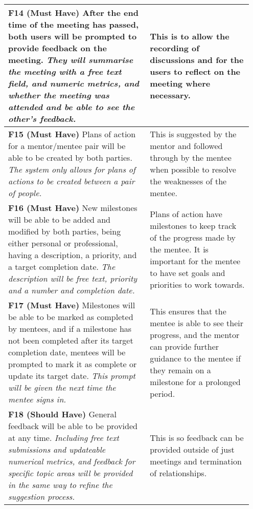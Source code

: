 \documentclass[10pt]{article}
\begin{document}
\begin{longtable}{|p{0.55\linewidth}|p{0.4\linewidth}|}
    \textbf{F14 (Must Have) }
    After the end time of the meeting has passed, both users will be prompted to
    provide feedback on the meeting.
    \textit{They will summarise the meeting with a free text field, and numeric
    metrics, and whether the meeting was attended and be able to see the other's
    feedback.}
        &
    This is to allow the recording of discussions and for the users to reflect
    on the meeting where necessary.
    \\ \hline

    \textbf{F15 (Must Have) }
    Plans of action for a mentor/mentee pair will be able to be created by both
    parties.
    \textit{The system only allows for plans of actions to be created between a
    pair of people.}
        &
    This is suggested by the mentor and followed through by the mentee when
    possible to resolve the weaknesses of the mentee.
    \\ \hline

    \textbf{F16 (Must Have) }
    New milestones will be able to be added and modified by both parties, being
    either personal or professional, having a description, a priority, and a
    target completion date.
    \textit{The description will be free text, priority and a number and
    completion date.}
        &
    Plans of action have milestones to keep track of the progress made by the
    mentee. It is important for the mentee to have set goals and priorities to
    work towards.
    \\ \hline

    \textbf{F17 (Must Have) }
    Milestones will be able to be marked as completed by mentees, and if a
    milestone has not been completed after its target completion date, mentees
    will be prompted to mark it as complete or update its target date.
    \textit{This prompt will be given the next time the mentee signs in.}
        &
    This ensures that the mentee is able to see their progress, and the mentor
    can provide further guidance to the mentee if they remain on a milestone for
    a prolonged period.
    \\ \hline

    \textbf{F18 (Should Have) }                                                     %
    General feedback will be able to be provided at any time.
    \textit{Including free text submissions and updateable numerical metrics,
    and feedback for specific topic areas will be provided in the same way to
    refine the suggestion process.}
        &
    This is so feedback can be provided outside of just meetings and termination
    of relationships.
    \\ \hline


\end{longtable}
\end{document}

